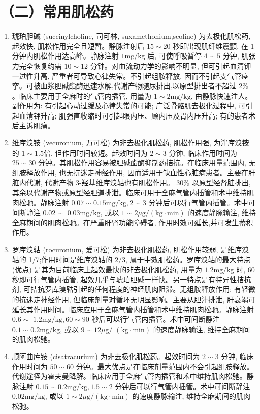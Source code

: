 \documentclass[10pt]{article}
\begin{document}
\section*{（二）常用肌松药}
\begin{enumerate}
  \item 琥珀胆碱 (succinylcholine, 司可林, suxamethonium,scoline) 为去极化肌松药, 起效快, 肌松作用完全且短暂。静脉注射后 $15 \sim 20$ 秒即出现肌纤维震颤, 在 1 分钟内肌松作用达高峰。静脉注射 $1 \mathrm{mg} / \mathrm{kg}$ 后, 可使呼吸暂停 $4 \sim 5$ 分钟, 肌张力完全恢复约需 $10 \sim 12$ 分钟。对血流动力学的影响不明显, 但可引起血清钾一过性升高, 严重者可导致心律失常。不引起组胺释放, 因而不引起支气管痉挛。可被血浆胆碱酯酶迅速水解,代谢产物随尿排出,以原型排出者不超过 $2 \%$ 。临床主要用于全麻时的气管内插管, 用量为 $1 \sim 2 \mathrm{mg} / \mathrm{kg}$, 由静脉快速注人。副作用为: 有引起心动过缓及心律失常的可能; 广泛骨骼肌去极化过程中, 可引起血清钾升高; 肌强直收缩时可引起眼内压、顾内压及胃内压升高; 有的患者术后主诉肌痛。

  \item 维库溴铵 (vecuronium, 万可松) 为非去极化肌松药, 肌松作用强, 为泮库溴铵的 $1 \sim 1.5$倍, 但作用时间较短。起效时间为 $2 \sim 3$ 分钟, 临床作用时间为 $25 \sim 30$ 分钟。其肌松作用容易被胆碱酯酶抑制药拮抗。在临床用量范围内, 无组胺释放作用, 也无抗迷走神经作用, 因而适用于缺血性心脏病患者。主要在肝脏内代谢, 代谢产物 3-羟基维库溴轱也有肌松作用。 $30 \%$ 以原型经肾脏排出, 其余以代谢产物或原型经胆道排泄。临床可用于全麻气管内插管和术中维持肌肉松驰。静脉注射 $0.07 \sim 0.15 \mathrm{mg} / \mathrm{kg}, 2 \sim 3$ 分钟后可以行气管内插管。术中可间断静注 $0.02 \sim$ $0.03 \mathrm{mg} / \mathrm{kg}$, 或以 $1 \sim 2 \mu \mathrm{g} /(\mathrm{kg} \cdot \mathrm{min})$ 的速度静脉输注, 维持全麻期间的肌肉松驰。在严重肝肾功能障碍者, 作用时效可延长,并可发生蓄积作用。

  \item 罗库溴轱 (rocuronium, 爱可松) 为非去极化肌松药, 肌松作用较弱, 是维库溴轱的 1/7;作用时间是维库溴轱的 $2 / 3$, 属于中效肌松药。罗库溴轱的最大特点 (优点) 是其为目前临床上起效最快的非去极化肌松药, 用量为 $1.2 \mathrm{mg} / \mathrm{kg}$ 时, 60 秒即可行气管内插管, 起效几乎与琥珀胆碱一样快。另一特点是有特异性拮抗剂, 可拮抗罗库溴轱引起的任何程度的神经肌肉阻滞。无组胺释放作用; 有轻微的抗迷走神经作用, 但临床剂量对循环无明显影响。主要从胆汁排泄, 肝衰竭可延长其作用时间。临床应用于全麻气管内插管和术中维持肌肉松驰。静脉注射 $0.6 \sim$ $1.2 \mathrm{mg} / \mathrm{kg}, 60 \sim 90$ 秒后可以行气管内插管。术中可间断静注 $0.1 \sim 0.2 \mathrm{mg} / \mathrm{kg}$, 或以 $9 \sim 12 \mu \mathrm{g} /$ $(\mathrm{kg} \cdot \mathrm{min})$ 的速度静脉输注, 维持全麻期间的肌肉松驰。

  \item 顺阿曲库铵 (cisatracurium) 为非去极化肌松药。起效时间为 $2 \sim 3$ 分钟, 临床作用时间为 $50 \sim 60$ 分钟。最大优点是在临床剂量范围内不会引起组胺释放。代谢途径为霍夫曼降解。临床应用于全麻气管内插管和术中维持肌肉松驰。静脉注射 $0.15 \sim 0.2 \mathrm{mg} / \mathrm{kg}, 1.5 \sim 2$ 分钟后可以行气管内插管。术中可间断静注 $0.02 \mathrm{mg} / \mathrm{kg}$, 或以 $1 \sim 2 \mu \mathrm{g} /(\mathrm{kg} \cdot \mathrm{min})$ 的速度静脉输注, 维持全麻期间的肌肉松驰。

\end{enumerate}
\end{document}
